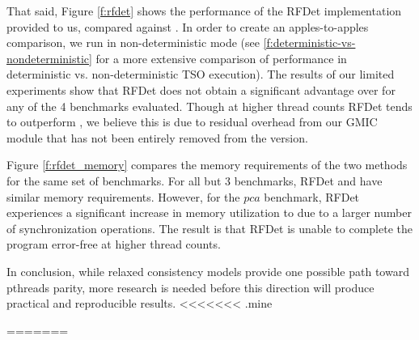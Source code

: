 That said, Figure \ref{f:rfdet} shows the performance of the RFDet implementation provided to us, compared against \lib{}. In order to create an apples-to-apples comparison, we run \lib{} in non-deterministic mode (see \ref{f:deterministic-vs-nondeterministic} for a more extensive comparison of \lib{} performance in deterministic vs. non-deterministic TSO execution). The results of our limited experiments show that RFDet does not obtain a significant advantage over \lib{} for any of the 4 benchmarks evaluated. Though at higher thread counts RFDet tends to outperform \lib{}, we believe this is due to residual overhead from our GMIC module that has not been entirely removed from the \libnodet{} version. 

Figure \ref{f:rfdet_memory} compares the memory requirements of the two methods for the same set of benchmarks. For all but 3 benchmarks, RFDet and \lib{} have similar memory requirements. However, for the $pca$ benchmark, RFDet experiences a significant increase in memory utilization to due to a larger number of synchronization operations. The result is that RFDet is unable to complete the program error-free at higher thread counts.

In conclusion, while relaxed consistency models provide one possible path toward pthreads parity, more research is needed before this direction will produce practical and reproducible results. 
<<<<<<< .mine








=======


